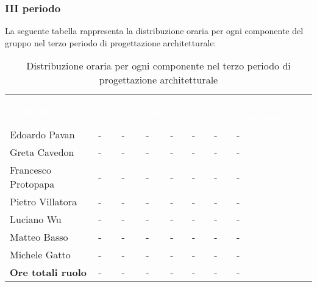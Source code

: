 \subsubsection{III periodo}
La seguente tabella rappresenta la distribuzione oraria per ogni componente del gruppo nel terzo periodo di progettazione architetturale:
\begin{table}[!htbp]
\begin{center}
\renewcommand{\arraystretch}{1.25}
\begin{tabular}{ m{}<{\centering}  m{}<{\centering} m{}<{\centering} m{}<{\centering}  m{}<{\centering}  m{}<{\centering}  m{}<{\centering}  m{}<{\centering}   }
	\rowcolor{darkblue}
	\textcolor{white}{\textbf{Componente}} &\textcolor{white}{\textbf{Re}}&\textcolor{white}{\textbf{Ad}}&\textcolor{white}{\textbf{An}}&\textcolor{white}{\textbf{Pt}}&\textcolor{white}{\textbf{Pr}}&\textcolor{white}{\textbf{Ve}}&\textcolor{white}{\textbf{Ore complessive}}\\ 

	Edoardo Pavan & - & - & - & - & - & - & -\\	

	\rowcolor{gray!10} Greta Cavedon & - & - & - & - & - & - & -\\
	
	Francesco Protopapa & - & - & - & - & - & - & -\\
	
	\rowcolor{gray!10} Pietro Villatora & - & - & - & - & - & - & -\\
	
	Luciano Wu & - & - & - & - & - & - & -\\
	
	\rowcolor{gray!10} Matteo Basso & - & - & - & - & - & - & -\\
	
	Michele Gatto & - & - & - & - & - & - & -\\
	
	\rowcolor{gray!10} \textbf{Ore totali ruolo} & - & - & - & - & - & - & -\\

\end{tabular}
\caption{Distribuzione oraria per ogni componente nel terzo periodo di progettazione architetturale}
\end{center}
\end{table}

